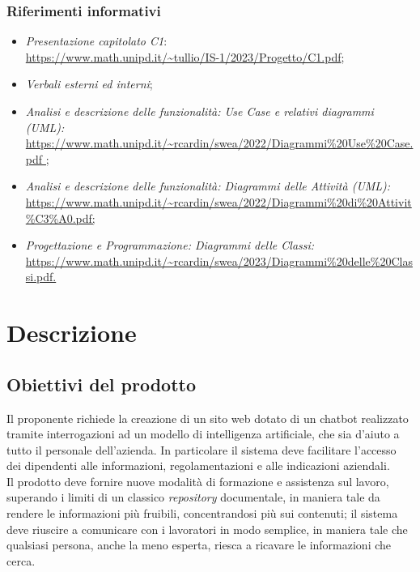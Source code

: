 \documentclass[10pt, a4paper]{article}
\begin{document}
    \subsubsection{Riferimenti informativi}
    
    \begin{itemize}
    \item \textit{Presentazione capitolato C1}:\\
    \href{https://www.math.unipd.it/~tullio/IS-1/2023/Progetto/C1.pdf}{https://www.math.unipd.it/\textasciitilde tullio/IS-1/2023/Progetto/C1.pdf};
    \item \textit{Verbali esterni ed interni};
    \item \textit{Analisi e descrizione delle funzionalità: Use Case e relativi diagrammi (UML):}\\
    \href{https://www.math.unipd.it/~rcardin/swea/2022/Diagrammi%20Use%20Case.pdf}{https://www.math.unipd.it/\textasciitilde rcardin/swea/2022/Diagrammi\%20Use\%20Case.pdf ;}
    \item \textit{Analisi e descrizione delle funzionalità: Diagrammi delle Attività (UML):}\\
    \href{https://www.math.unipd.it/~rcardin/swea/2022/Diagrammi%20di%20Attivit%C3%A0.pdf}{https://www.math.unipd.it/\textasciitilde rcardin/swea/2022/Diagrammi\%20di\%20Attivit\%C3\%A0.pdf;}
    

    \item \textit{Progettazione e Programmazione: Diagrammi delle Classi:}\\
    \href{https://www.math.unipd.it/~rcardin/swea/2023/Diagrammi%20delle%20Classi.pdf}{https://www.math.unipd.it/\textasciitilde rcardin/swea/2023/Diagrammi\%20delle\%20Classi.pdf.}
    \end{itemize}

\newpage
\section{Descrizione}
\subsection{Obiettivi del prodotto}
Il proponente richiede la creazione di un sito web dotato di un chatbot realizzato tramite interrogazioni ad un modello di intelligenza artificiale, che sia d'aiuto a tutto il personale dell'azienda.
In particolare il sistema deve facilitare l'accesso dei dipendenti alle informazioni, regolamentazioni e alle indicazioni aziendali.\\
Il prodotto deve fornire nuove modalità di formazione e assistenza sul lavoro, superando i limiti di un classico \textit{repository} documentale, in maniera tale da rendere le informazioni più fruibili, concentrandosi più sui contenuti; il sistema deve riuscire a comunicare con i lavoratori in modo semplice, in maniera tale che qualsiasi persona, anche la meno esperta, riesca a ricavare le informazioni che cerca.
\end{document}
